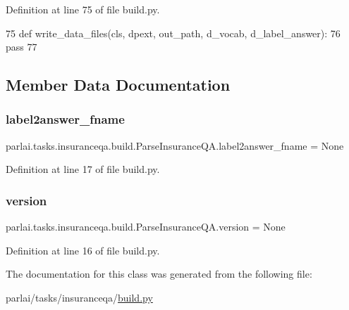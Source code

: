 Definition at line 75 of file build.\+py.


\begin{DoxyCode}
75     \textcolor{keyword}{def }write\_data\_files(cls, dpext, out\_path, d\_vocab, d\_label\_answer):
76         \textcolor{keywordflow}{pass}
77 
\end{DoxyCode}


\subsection{Member Data Documentation}
\mbox{\label{classparlai_1_1tasks_1_1insuranceqa_1_1build_1_1ParseInsuranceQA_a43a944262ff61deb4d06c2f9af01588f}} 
\subsubsection{\texorpdfstring{label2answer\+\_\+fname}{label2answer\_fname}}
{\footnotesize\ttfamily parlai.\+tasks.\+insuranceqa.\+build.\+Parse\+Insurance\+Q\+A.\+label2answer\+\_\+fname = None\hspace{0.3cm}{\ttfamily [static]}}



Definition at line 17 of file build.\+py.

\mbox{\label{classparlai_1_1tasks_1_1insuranceqa_1_1build_1_1ParseInsuranceQA_a0d836d18b0fe51bb6920e5cc743b500d}} 
\subsubsection{\texorpdfstring{version}{version}}
{\footnotesize\ttfamily parlai.\+tasks.\+insuranceqa.\+build.\+Parse\+Insurance\+Q\+A.\+version = None\hspace{0.3cm}{\ttfamily [static]}}



Definition at line 16 of file build.\+py.



The documentation for this class was generated from the following file\+:\begin{DoxyCompactItemize}
\item 
parlai/tasks/insuranceqa/\hyperlink{parlai_2tasks_2insuranceqa_2build_8py}{build.\+py}\end{DoxyCompactItemize}
